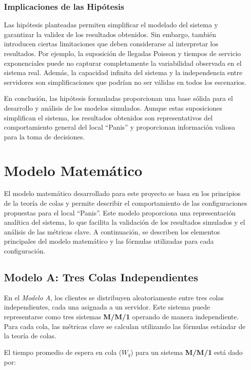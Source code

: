 \documentclass[a4paper,12pt]{article}
\begin{document}
\subsubsection{Implicaciones de las Hipótesis}

Las hipótesis planteadas permiten simplificar el modelado del sistema y garantizar la validez de los resultados obtenidos. Sin embargo, también introducen ciertas limitaciones que deben considerarse al interpretar los resultados. Por ejemplo, la suposición de llegadas Poisson y tiempos de servicio exponenciales puede no capturar completamente la variabilidad observada en el sistema real. Además, la capacidad infinita del sistema y la independencia entre servidores son simplificaciones que podrían no ser válidas en todos los escenarios.

En conclusión, las hipótesis formuladas proporcionan una base sólida para el desarrollo y análisis de los modelos simulados. Aunque estas suposiciones simplifican el sistema, los resultados obtenidos son representativos del comportamiento general del local “Panis” y proporcionan información valiosa para la toma de decisiones.

\section{Modelo Matemático}

El modelo matemático desarrollado para este proyecto se basa en los principios de la teoría de colas y permite describir el comportamiento de las configuraciones propuestas para el local “Panis”. Este modelo proporciona una representación analítica del sistema, lo que facilita la validación de los resultados simulados y el análisis de las métricas clave. A continuación, se describen los elementos principales del modelo matemático y las fórmulas utilizadas para cada configuración.

\subsection{Modelo A: Tres Colas Independientes}

En el \textit{Modelo A}, los clientes se distribuyen aleatoriamente entre tres colas independientes, cada una asignada a un servidor. Este sistema puede representarse como tres sistemas \textbf{M/M/1} operando de manera independiente. Para cada cola, las métricas clave se calculan utilizando las fórmulas estándar de la teoría de colas.

El tiempo promedio de espera en cola (\( W_q \)) para un sistema \textbf{M/M/1} está dado por:
\end{document}

